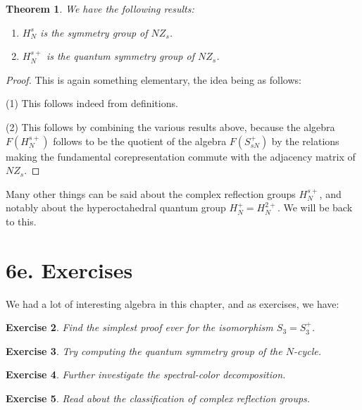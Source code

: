 \documentclass[12pt]{amsbook}
\newtheorem{theorem}{Theorem}[chapter]
\newtheorem{exercise}[theorem]{Exercise}
\begin{document}
\begin{theorem}
We have the following results:
\begin{enumerate}
\item $H_N^s$ is the symmetry group of $NZ_s$.

\item $H_N^{s+}$ is the quantum symmetry group of $NZ_s$.
\end{enumerate}
\end{theorem}

\begin{proof}
This is again something elementary, the idea being as follows:

\medskip

(1) This follows indeed from definitions.

\medskip

(2) This follows by combining the various results above, because the algebra $F(H_N^{s+})$ follows to be the quotient of the algebra $F(S_{sN}^+)$ by the relations making the fundamental corepresentation commute with the adjacency matrix of $NZ_s$.
\end{proof}

Many other things can be said about the complex reflection groups $H_N^{s+}$, and notably about the hyperoctahedral quantum group $H_N^+=H_N^{2+}$. We will be back to this.

\section*{6e. Exercises}

We had a lot of interesting algebra in this chapter, and as exercises, we have:

\begin{exercise}
Find the simplest proof ever for the isomorphism $S_3=S_3^+$.
\end{exercise}

\begin{exercise}
Try computing the quantum symmetry group of the $N$-cycle.
\end{exercise}

\begin{exercise}
Further investigate the spectral-color decomposition.
\end{exercise}

\begin{exercise}
Read about the classification of complex reflection groups.
\end{exercise}
\end{document}
